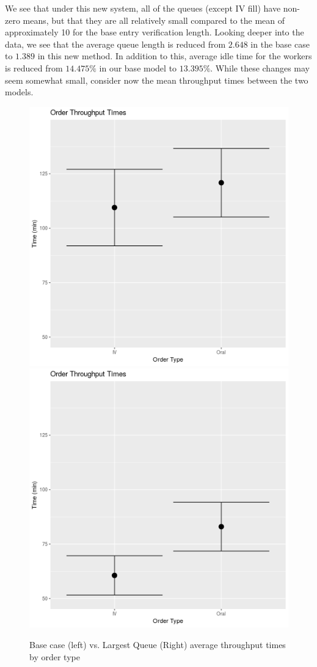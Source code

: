 \documentclass[10pt]{report}            %
\begin{document}
We see that under this new system, all of the queues (except IV fill) have non-zero means, but that they are all relatively small compared to the mean of approximately 10 for the base entry verification length. Looking deeper into the data, we see that the average queue length is reduced from $2.648$ in the base case to $1.389$ in this new method. In addition to this, average idle time for the workers is reduced from $14.475\%$ in our base model to $13.395\%$. While these changes may seem somewhat small, consider now the mean throughput times between the two models.
\begin{figure}
\centering
\includegraphics[scale=.35]{BaseThroughputCIs.png}
\includegraphics[scale=.35]{LongestThroughputCIs.png}
\caption{Base case (left) vs. Largest Queue (Right) average throughput times by order type}
\label{fig:basevlongthrough}
\end{figure}
\end{document}
